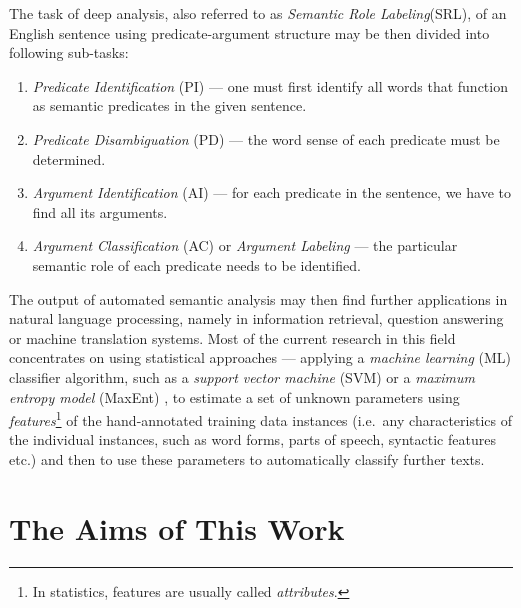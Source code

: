 \documentclass[12pt,notitlepage]{report}
\begin{document}
The task of deep analysis, also referred to as \emph{Semantic Role Labeling}(SRL), of an English sentence using predicate-argument structure may be then divided into following sub-tasks:
\begin{enumerate}
    \item \emph{Predicate Identification} (PI) --- one must first identify all words that function as semantic predicates in the given sentence.
    \item \emph{Predicate Disambiguation} (PD) --- the word sense of each predicate must be determined.
    \item \emph{Argument Identification}  (AI) --- for each predicate in the sentence, we have to find all its arguments.
    \item \emph{Argument Classification} (AC) or \emph{Argument Labeling} --- the particular semantic role of each predicate needs to be identified.
\end{enumerate}

The output of automated semantic analysis may then find further applications in natural language processing, namely in information retrieval, question answering or machine translation systems. Most of the current research in this field concentrates on using statistical approaches --- applying a \emph{machine learning} (ML) classifier algorithm, such as a \emph{support vector machine} (SVM) \citep{boser92} or a \emph{maximum entropy model} (MaxEnt) \citep{jelinek97}, to estimate a set of unknown parameters using \emph{features}\footnote{In statistics, features are usually called \emph{attributes}.} of the hand-annotated training data instances (i.e.\ any characteristics of the individual instances, such as word forms, parts of speech, syntactic features etc.) and then to use these parameters to automatically classify further texts.

\section{The Aims of This Work}\label{aims}
\end{document}
